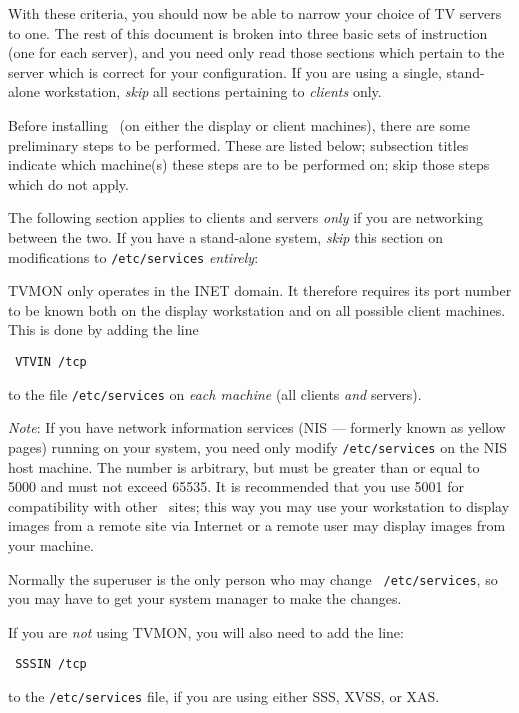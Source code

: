 With these criteria, you should now be able to narrow your choice of TV
servers to one.  The rest of this document is broken into three basic sets
of instruction (one for each server), and you need only read those
sections which pertain to the server which is correct for your
configuration.  If you are using a single, stand-alone workstation,
{\it skip} all sections pertaining to {\it clients} only.

\eject
{}

Before installing \AIPS\ (on either the display or client machines),
there are some preliminary steps to be performed.  These are listed
below; subsection titles indicate which machine(s) these steps
are to be performed on; skip those steps which do not apply.

The following section applies to clients and servers {\it only} if you
are networking between the two. If you have a stand-alone system,
{\it skip} this section on modifications to {\tt /etc/services}
{\it entirely}:


TVMON only operates in the INET domain.  It therefore requires its
port number to be known both on the display workstation and on all
possible client machines.  This is done by adding the line

{\tt \hskip 2cm VTVIN \qquad \qquad {}/tcp}

\noindent
to the file {\tt /etc/services} on {\it each machine} (all clients
{\it and} servers).

{\it Note\/}: If you have network information services (NIS ---
formerly known as yellow pages) running on your system, you need only
modify {\tt /etc/services} on the NIS host machine.  The number is
arbitrary, but must be greater than or equal to 5000 and must not
exceed 65535.  It is recommended that you use 5001 for compatibility
with other \AIPS\ sites; this way you may use your workstation to
display images from a remote site via Internet or a remote user may
display images from your machine.

Normally the superuser is the only person who may change {\tt
/etc/services}, so you may have to get your system manager to make the
changes.

If you are {\it not} using TVMON, you will also need to add the line:

{\tt \hskip 2cm SSSIN \qquad \qquad {}/tcp}

\noindent
to the {\tt /etc/services} file, if you are using either SSS, XVSS, or
\hbox{XAS}.

